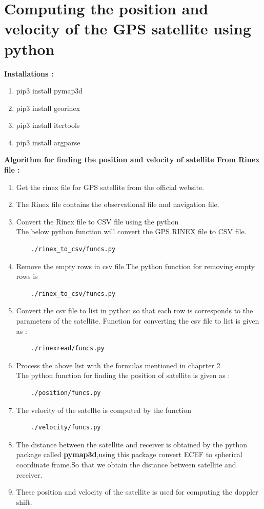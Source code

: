 \section{Computing the position and velocity of the  GPS satellite using python}
\textbf{Installations :}
\begin{enumerate}
\item pip3 install pymap3d
\item pip3 install georinex
\item pip3 install itertools
\item pip3 install argparse
\end{enumerate}
\textbf{Algorithm for finding the position and velocity of satellite From Rinex file :}
\begin{enumerate}
  \item Get the rinex file for GPS  satellite from the official website.
  \item The Rinex file contains the observational file and navigation file.
  \item Convert the Rinex file to CSV file using the python \\
  The below python function will convert the GPS RINEX file to CSV file.
  \begin{lstlisting}
    ./rinex_to_csv/funcs.py
  \end{lstlisting}
  \item Remove the empty rows in csv file.The python function for removing empty rows is 
  \begin{lstlisting}
    ./rinex_to_csv/funcs.py
  \end{lstlisting}
  \item Convert the csv file to list in python so that each row is corresponds to the parameters of the satellite. Function for converting the csv file to list is given as :
  \begin{lstlisting}
    ./rinexread/funcs.py
  \end{lstlisting} 
  \item Process the above list with the formulas mentioned in chaprter 2 \\
  The python function for finding the position of satellite is given as :
  \begin{lstlisting}
    ./position/funcs.py
  \end{lstlisting}
  \item The velocity of the satellte is computed by the function 
  \begin{lstlisting}
    ./velocity/funcs.py
  \end{lstlisting}
  \item The distance between the satellite and receiver is obtained by the python package called \textbf{pymap3d},using this package convert ECEF to spherical coordinate frame.So that we obtain the distance between satellite and receiver.
  \item These position and velocity of the satellite is used for computing the doppler shift.
\end{enumerate}
